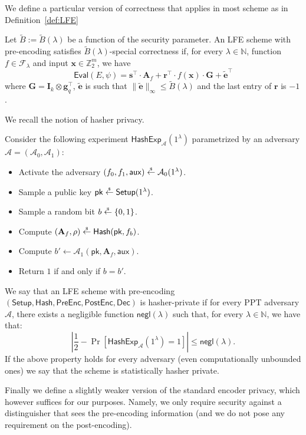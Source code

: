 \documentclass{theoretics}
\newcommand{\getsr}{\overset{\raisebox{-1pt}{$\scriptscriptstyle \$$}}{\gets}}
\newcommand{\sample}{\getsr}
\newcommand{\Pre}{\mathsf{Pre}}
\newcommand{\Post}{\mathsf{Post}}
\newcommand{\N}{\mathbb{N}}
\newcommand{\Z}{\mathbb{Z}}
\newcommand{\negl}{\mathsf{negl}}
\renewcommand{\sec}{\ensuremath{\lambda}}
\newcommand{\aux}{\mathsf{aux}}
\newcommand{\Adv}{\mathcal{A}}
\newcommand{\algofont}[1]{\ensuremath{\mathsf{#1}}}
\newcommand{\Enc}{{\algofont{Enc}}}
\newcommand{\Dec}{{\algofont{Dec}}}
\newcommand{\Setup}{{\algofont{Setup}}}
\newcommand{\Eval}{\algofont{Eval}\xspace}
\newcommand{\Hash}{{\algofont{Hash}}}
\newcommand{\id}{\ensuremath{\mathbf{I}}}
\newcommand{\pk}{{\mathsf{pk}}}
\newcommand{\defref}[1]{Definition~\ref{def:#1}}
\newcommand\bbbone{1}
\begin{document}
We define a particular version of correctness that applies in most scheme as in \defref{LFE}

\begin{definition}
Let $\widetilde{B}:=\widetilde{B}(\sec)$ be a function of the security parameter. An LFE scheme with pre-encoding satisfies $\widetilde{B}(\sec)$-special correctness if, for every $\sec\in\N$, function $f\in\mathcal{F}_\sec$ and input $\mathbf{x}\in\Z_2^m$, we have
\[
\Eval(E, \psi) = \mathbf{s}^\intercal\cdot \mathbf{A}_f+ \mathbf{r}^\intercal\cdot f(\mathbf{x})\cdot \mathbf{G}+\mathbf{\widetilde{e}}^\intercal
\]
where $\mathbf{G}=\id_k\otimes \mathbf{g}_q^\intercal$, $\mathbf{\widetilde{e}}$ is such that $\lVert\mathbf{\widetilde{e}}\rVert_\infty\le \widetilde{B}(\sec)$ and the last entry of $\mathbf{r}$ is $-1$.
\end{definition}
We recall the notion of hasher privacy.
\begin{definition}
Consider the following experiment $\mathsf{HashExp}_{\mathcal{A}}(\bbbone^\sec)$ parametrized by an adversary $\mathcal{A} = (\mathcal{A}_0, \mathcal{A}_1)$:
\begin{itemize}
    \item Activate the adversary $(f_0, f_1, \aux)\sample\Adv_0(\bbbone^\sec)$.
    \item Sample a public key $\pk\sample\Setup(\bbbone^\sec)$.
    \item Sample a random bit $b\sample\{0, 1\}$. 
    \item Compute $(\mathbf{A}_f, \rho)\sample\Hash(\pk, f_b)$.
    \item Compute $b' \gets \Adv_1(\pk, \mathbf{A}_f, \aux)$.
    \item Return $1$ if and only if $b =b'$.
\end{itemize}
We say that an LFE scheme with pre-encoding $(\Setup, \Hash, \Pre\Enc, \Post\Enc, \Dec)$ is hasher-private if for every PPT adversary $\mathcal{A}$, there exists a negligible function $\negl(\sec)$ such that, for every $\sec\in\N$, we have that:
\[
\left|\frac{1}{2} - \Pr\left[\mathsf{HashExp}_{\mathcal{A}}(\bbbone^\sec) = 1\right] \right|\le\negl(\sec).
\]
If the above property holds for every adversary (even computationally unbounded ones) we say that the scheme is statistically hasher private.
\end{definition}
Finally we define a slightly weaker version of the standard encoder privacy, which however suffices for our purposes. Namely, we only require security against a distinguisher that sees the pre-encoding information (and we do not pose any requirement on the post-encoding).
\end{document}
